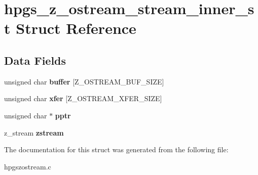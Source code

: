 \section{hpgs\_\-z\_\-ostream\_\-stream\_\-inner\_\-st Struct Reference}
\label{structhpgs__z__ostream__stream__inner__st}
\subsection*{Data Fields}
\begin{DoxyCompactItemize}
\item 
unsigned char {\bfseries buffer} [Z\_\-OSTREAM\_\-BUF\_\-SIZE]\label{structhpgs__z__ostream__stream__inner__st_a46552d8317f7a2178b7611ea03637bcd}

\item 
unsigned char {\bfseries xfer} [Z\_\-OSTREAM\_\-XFER\_\-SIZE]\label{structhpgs__z__ostream__stream__inner__st_afe1f61e3c1e1c0564e9900bd17ba8eee}

\item 
unsigned char $\ast$ {\bfseries pptr}\label{structhpgs__z__ostream__stream__inner__st_ac2a3d49e544b3f532ceb1b41ac24f306}

\item 
z\_\-stream {\bfseries zstream}\label{structhpgs__z__ostream__stream__inner__st_a410e9f5c62dd8a540b8d000cb82592fa}

\end{DoxyCompactItemize}


The documentation for this struct was generated from the following file:\begin{DoxyCompactItemize}
\item 
hpgszostream.c\end{DoxyCompactItemize}
